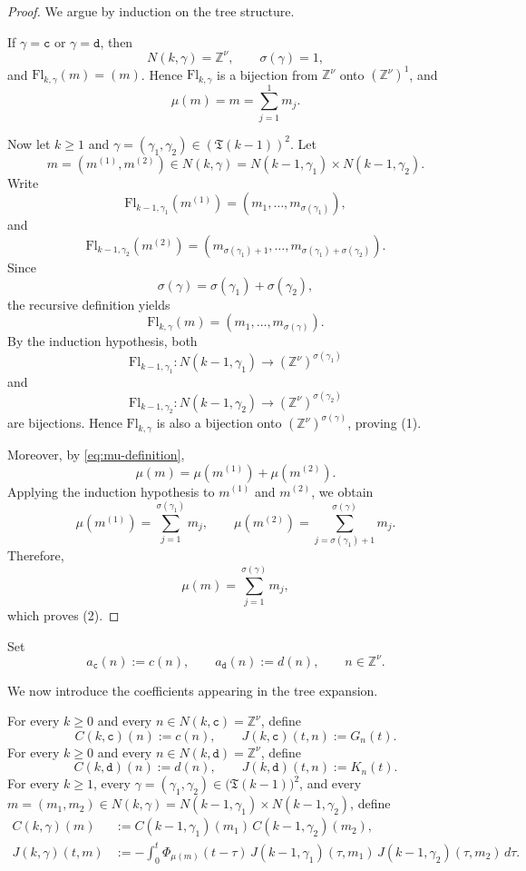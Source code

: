 \documentclass[12pt,reqno,tbtags]{amsart}
\newcommand\1{\mathbbm{1}}
\begin{document}
\begin{proof}
We argue by induction on the tree structure.

If $\gamma=\mathtt{c}$ or $\gamma=\mathtt{d}$, then
\[
N(k,\gamma)=\mathbb{Z}^{\nu},
\qquad
\sigma(\gamma)=1,
\]
and $\mathrm{Fl}_{k,\gamma}(m)=(m)$. Hence $\mathrm{Fl}_{k,\gamma}$ is a bijection
from $\mathbb{Z}^{\nu}$ onto $(\mathbb{Z}^{\nu})^1$, and
\[
\mu(m)=m=\sum_{j=1}^{1}m_j.
\]

Now let $k\geq 1$ and $\gamma=(\gamma_1,\gamma_2)\in(\mathfrak{T}(k-1))^2$.
Let
\[
m=(m^{(1)},m^{(2)})\in N(k,\gamma)
=
N(k-1,\gamma_1)\times N(k-1,\gamma_2).
\]
Write
\[
\mathrm{Fl}_{k-1,\gamma_1}(m^{(1)})
=
(m_1,\dots,m_{\sigma(\gamma_1)}),
\]
and
\[
\mathrm{Fl}_{k-1,\gamma_2}(m^{(2)})
=
(m_{\sigma(\gamma_1)+1},\dots,m_{\sigma(\gamma_1)+\sigma(\gamma_2)}).
\]
Since
\[
\sigma(\gamma)=\sigma(\gamma_1)+\sigma(\gamma_2),
\]
the recursive definition yields
\[
\mathrm{Fl}_{k,\gamma}(m)
=
(m_1,\dots,m_{\sigma(\gamma)}).
\]
By the induction hypothesis, both
\[
\mathrm{Fl}_{k-1,\gamma_1}:N(k-1,\gamma_1)\to(\mathbb{Z}^{\nu})^{\sigma(\gamma_1)}
\]
and
\[
\mathrm{Fl}_{k-1,\gamma_2}:N(k-1,\gamma_2)\to(\mathbb{Z}^{\nu})^{\sigma(\gamma_2)}
\]
are bijections. Hence $\mathrm{Fl}_{k,\gamma}$ is also a bijection onto
$(\mathbb{Z}^{\nu})^{\sigma(\gamma)}$, proving (1).

Moreover, by \eqref{eq:mu-definition},
\[
\mu(m)=\mu(m^{(1)})+\mu(m^{(2)}).
\]
Applying the induction hypothesis to $m^{(1)}$ and $m^{(2)}$, we obtain
\[
\mu(m^{(1)})=\sum_{j=1}^{\sigma(\gamma_1)}m_j,
\qquad
\mu(m^{(2)})=\sum_{j=\sigma(\gamma_1)+1}^{\sigma(\gamma)}m_j.
\]
Therefore,
\[
\mu(m)=\sum_{j=1}^{\sigma(\gamma)}m_j,
\]
which proves (2).
\end{proof}

Set
\[
a_{\mathtt c}(n):=c(n),
\qquad
a_{\mathtt d}(n):=d(n),
\qquad n\in\mathbb Z^\nu.
\]

We now introduce the coefficients appearing in the tree expansion.

For every $k\geq 0$ and every $n\in N(k,\mathtt{c})=\mathbb{Z}^{\nu}$, define
\begin{equation}\label{eq:base-c}
C(k,\mathtt{c})(n):=c(n),
\qquad
J(k,\mathtt{c})(t,n):=G_n(t).
\end{equation}
For every $k\geq 0$ and every $n\in N(k,\mathtt{d})=\mathbb{Z}^{\nu}$, define
\begin{equation}\label{eq:base-d}
C(k,\mathtt{d})(n):=d(n),
\qquad
J(k,\mathtt{d})(t,n):=K_n(t).
\end{equation}
For every $k\geq 1$, every $\gamma=(\gamma_1,\gamma_2)\in \big(\mathfrak{T}(k-1)\big)^2$,
and every $m=(m_1,m_2)\in N(k,\gamma)=N(k-1,\gamma_1)\times N(k-1,\gamma_2)$, define
\begin{align}
C(k,\gamma)(m)
&:= C(k-1,\gamma_1)(m_1)\,C(k-1,\gamma_2)(m_2), \label{eq:recursive-C}\\
J(k,\gamma)(t,m)
&:= -\int_0^t \Phi_{\mu(m)}(t-\tau)\,
J(k-1,\gamma_1)(\tau,m_1)\,
J(k-1,\gamma_2)(\tau,m_2)\,d\tau . \label{eq:recursive-J}
\end{align}
\end{document}
